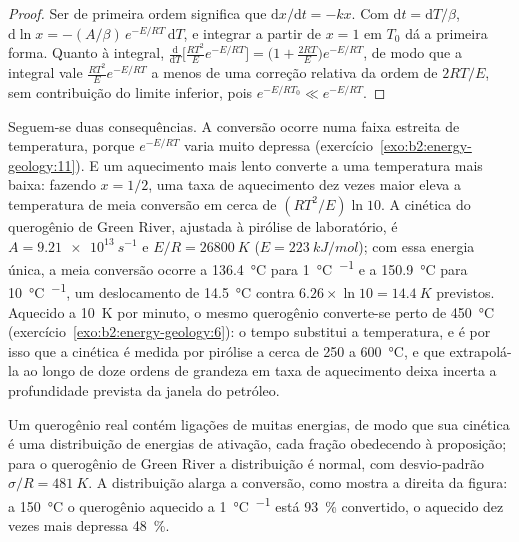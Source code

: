 \begin{proof}
Ser de primeira ordem significa que $\mathrm{d}x/\mathrm{d}t = -k x$. Com $\mathrm{d}t = \mathrm{d}T/\beta$,
$\mathrm{d}\ln x = -(A/\beta)\,e^{-E/RT}\,\mathrm{d}T$, e integrar a partir de $x = 1$ em $T_0$ dá
a primeira forma. Quanto à integral, $\frac{\mathrm{d}}{\mathrm{d}T}\bigl[\frac{RT^2}{E}e^{-E/RT}\bigr]
= \bigl(1 + \frac{2RT}{E}\bigr)e^{-E/RT}$, de modo que a integral vale $\frac{RT^2}{E}e^{-E/RT}$ a menos de uma
correção relativa da ordem de $2RT/E$, sem contribuição do limite inferior, pois $e^{-E/RT_0} \ll
e^{-E/RT}$.
\end{proof}

Seguem-se duas consequências. A conversão ocorre numa faixa estreita de temperatura, porque
$e^{-E/RT}$ varia muito depressa (exercício~\ref{exo:b2:energy-geology:11}). E um aquecimento mais lento converte
a uma temperatura mais baixa: fazendo $x = 1/2$, uma taxa de aquecimento dez vezes maior eleva a temperatura de
meia conversão em cerca de $(RT^2/E)\ln 10$. A cinética do querogênio de Green River, ajustada à
pirólise de laboratório, é $A = \qty{9.21e13}{s^{-1}}$ e $E/R = \qty{26800}{K}$ ($E =
\qty{223}{kJ/mol}$); com essa energia única, a meia conversão ocorre a \qty{136.4}{\celsius} para
\qty{1}{\celsius\per\Myr} e a \qty{150.9}{\celsius} para \qty{10}{\celsius\per\Myr}, um deslocamento de
\qty{14.5}{\celsius} contra $6.26 \times \ln 10 = \qty{14.4}{K}$ previstos. Aquecido a
\qty{10}{K} por minuto, o mesmo querogênio converte-se perto de \qty{450}{\celsius}
(exercício~\ref{exo:b2:energy-geology:6}): o tempo substitui a temperatura, e é por isso que a cinética é
medida por pirólise a cerca de 250 a \qty{600}{\celsius}, e que extrapolá-la ao longo de doze
ordens de grandeza em taxa de aquecimento deixa incerta a profundidade prevista da janela do petróleo.

Um querogênio real contém ligações de muitas energias, de modo que sua cinética é uma distribuição de energias
de ativação, cada fração obedecendo à proposição; para o querogênio de Green River a distribuição é
normal, com desvio-padrão $\sigma/R = \qty{481}{K}$. A distribuição alarga a
conversão, como mostra a direita da figura: a \qty{150}{\celsius} o querogênio aquecido a
\qty{1}{\celsius\per\Myr} está \qty{93}{\percent} convertido, o aquecido dez vezes mais depressa
\qty{48}{\percent}.

